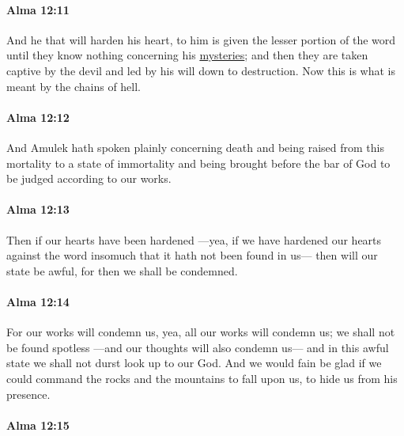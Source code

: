 		\paragraph{Alma 12:11} %
			\label{ALMA-12-11}
			
			And he that will harden his heart,
			to him is given the lesser portion of the word
			until they know nothing concerning his \hyperref[MYSTERY]{mysteries};
			and then they are taken captive by the devil
			and led by his will down to destruction.
			Now this is what is meant by the chains of hell.

		\paragraph{Alma 12:12} %
			\label{ALMA-12-12}

			And Amulek hath spoken plainly concerning death
			and being raised from this mortality to a state of immortality
			and being brought before the bar of God
			to be judged according to our works.

		\paragraph{Alma 12:13} %
			\label{ALMA-12-13}

			Then if our hearts have been hardened
			---yea, if we have hardened our hearts against the word
			insomuch that it hath not been found in us---
			then will our state be awful,
			for then we shall be condemned.

		\paragraph{Alma 12:14} %
			\label{ALMA-12-14}

			For our works will condemn us,
			yea, all our works will condemn us;
			we shall not be found spotless
			---and our thoughts will also condemn us---
			and in this awful state we shall not durst look up to our God.
			And we would fain be glad
			if we could command the rocks and the mountains to fall upon us,
			to hide us from his presence.

		\paragraph{Alma 12:15} %
			\label{ALMA-12-15}

